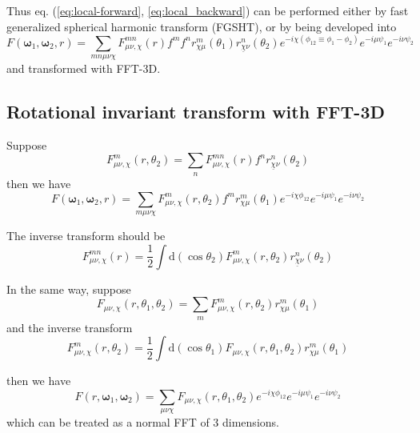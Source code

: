 Thus eq. (\ref{eq:local-forward}, \ref{eq:local_backward}) can be
performed either by fast generalized spherical harmonic transform
(\acs{FGSHT}), or by being developed into
\begin{equation}
F(\boldsymbol{\omega}_{1},\boldsymbol{\omega}_{2},r)=\sum_{mn\mu\nu\chi}F_{\mu\nu,\chi}^{mn}(r)f^{m}f^{n}r_{\chi\mu}^{m}(\theta_{1})r_{\underline{\chi}\nu}^{n}(\theta_{2})e^{-i\chi(\phi_{12}\equiv\phi_{1}-\phi_{2})}e^{-i\mu\psi_{1}}e^{-i\nu\psi_{2}}\label{eq:eq_s1_local}
\end{equation}
and transformed with \acs{FFT}-3D.

\subsection*{Rotational invariant transform with FFT-3D}

Suppose
\begin{equation}
F_{\mu\nu,\chi}^{m}(r,\theta_{2})=\sum_{n}F_{\mu\nu,\chi}^{mn}(r)f^{n}r_{\underline{\chi}\nu}^{n}(\theta_{2})
\end{equation}
then we have
\begin{equation}
F(\boldsymbol{\omega}_{1},\boldsymbol{\omega}_{2},r)=\sum_{m\mu\nu\chi}F_{\mu\nu,\chi}^{m}(r,\theta_{2})f^{m}r_{\chi\mu}^{m}(\theta_{1})e^{-i\chi\phi_{12}}e^{-i\mu\psi_{1}}e^{-i\nu\psi_{2}}
\end{equation}

The inverse transform should be
\begin{equation}
F_{\mu\nu,\chi}^{mn}(r)=\frac{1}{2}\int\mathrm{d}(\cos\theta_{2})F_{\mu\nu,\chi}^{m}(r,\theta_{2})r_{\underline{\chi}\nu}^{n}(\theta_{2})
\end{equation}

In the same way, suppose
\begin{equation}
F_{\mu\nu,\chi}(r,\theta_{1},\theta_{2})=\sum_{m}F_{\mu\nu,\chi}^{m}(r,\theta_{2})r_{\chi\mu}^{m}(\theta_{1})
\end{equation}
and the inverse transform
\begin{equation}
F_{\mu\nu,\chi}^{m}(r,\theta_{2})=\frac{1}{2}\int\mathrm{d}(\cos\theta_{1})F_{\mu\nu,\chi}(r,\theta_{1},\theta_{2})r_{\chi\mu}^{m}(\theta_{1})
\end{equation}

then we have
\begin{equation}
F(r,\boldsymbol{\omega}_{1},\boldsymbol{\omega}_{2})=\sum_{\mu\nu\chi}F_{\mu\nu,\chi}(r,\theta_{1},\theta_{2})e^{-i\chi\phi_{12}}e^{-i\mu\psi_{1}}e^{-i\nu\psi_{2}}\label{eq:eq_s3_local}
\end{equation}
which can be treated as a normal \acs{FFT} of 3 dimensions.

